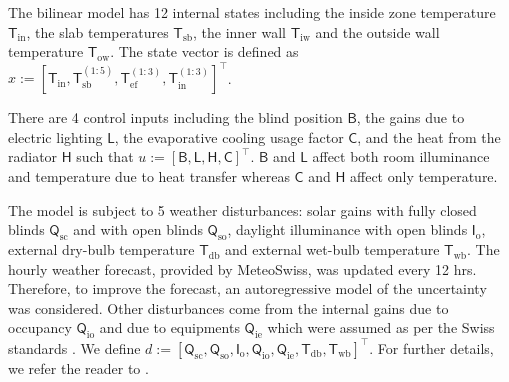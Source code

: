 
The bilinear model has 12 internal states including the inside zone temperature $\mathsf{T}_{\mathrm{in}}$, the slab temperatures $\mathsf{T}_{\mathrm{sb}}$, the inner wall $\mathsf{T}_{\mathrm{iw}}$ and the outside wall temperature $\mathsf{T}_{\mathrm{ow}}$. The state vector is defined as $x:=[\mathsf{T}_{\mathrm{in}}, \mathsf{T}_{\mathrm{sb}}^{(1:5)}, \mathsf{T}_{\mathrm{ef}}^{(1:3)}, \mathsf{T}_{\mathrm{in}}^{(1:3)}]^\top$.

There are 4 control inputs including the blind position $\mathsf{B}$, the gains due to electric lighting $\mathsf{L}$, the evaporative cooling usage factor $\mathsf{C}$, and the heat from the radiator $\mathsf{H}$ such that $u:=[\mathsf{B},\mathsf{L},\mathsf{H},\mathsf{C}]^\top$. $\mathsf{B}$ and $\mathsf{L}$ affect both room illuminance and temperature due to heat transfer whereas $\mathsf{C}$ and $\mathsf{H}$ affect only temperature.

The model is subject to 5 weather disturbances: solar gains with fully closed blinds $\mathsf{Q}_{\mathrm{sc}}$ and with open blinds $\mathsf{Q}_{\mathrm{so}}$, daylight illuminance with open blinds $\mathsf{I}_{\mathrm{o}}$, external dry-bulb temperature $\mathsf{T}_{\mathrm{db}}$ and external wet-bulb temperature $\mathsf{T}_{\mathrm{wb}}$. 
The hourly weather forecast, provided by MeteoSwiss, was updated every 12 hrs. Therefore, to improve the forecast,  an autoregressive model of the uncertainty was considered.
Other disturbances come from the internal gains due to occupancy $\mathsf{Q}_{\mathrm{io}}$ and due to equipments $\mathsf{Q}_{\mathrm{ie}}$ which were assumed as per the Swiss standards \cite{Merkblatt2006}. We define $d:=[\mathsf{Q}_{\mathrm{sc}},\mathsf{Q}_{\mathrm{so}},\mathsf{I}_{\mathrm{o}},\mathsf{Q}_{\mathrm{io}},\mathsf{Q}_{\mathrm{ie}},\mathsf{T}_{\mathrm{db}},\mathsf{T}_{\mathrm{wb}}]^\top$. For further details, we refer the reader to \cite{Oldewurtel2011}.

